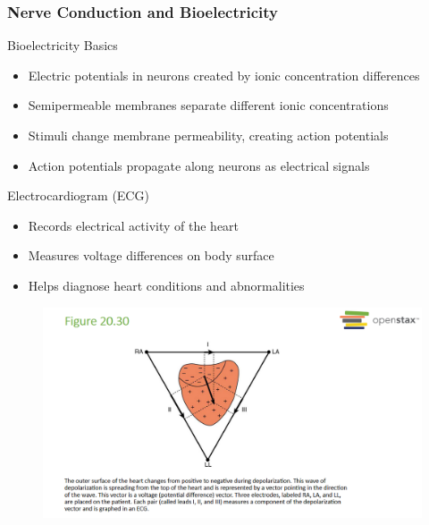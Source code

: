 \documentclass{beamer}
\begin{document}
\begin{frame}
    \frametitle{Nerve Conduction and Bioelectricity}
    \begin{block}{Bioelectricity Basics}
        \begin{itemize}
            \item Electric potentials in neurons created by ionic concentration differences
            \item Semipermeable membranes separate different ionic concentrations
            \item Stimuli change membrane permeability, creating action potentials
            \item Action potentials propagate along neurons as electrical signals
        \end{itemize}
    \end{block}
    \begin{block}{Electrocardiogram (ECG)}
        \begin{itemize}
            \item Records electrical activity of the heart
            \item Measures voltage differences on body surface
            \item Helps diagnose heart conditions and abnormalities
        \end{itemize}
    \end{block}
   
\end{frame}
\begin{frame}{}
    \begin{figure}
        \centering
        \includegraphics[width=1\linewidth]{ecg.png}
    \end{figure}
\end{frame}

\end{document}
